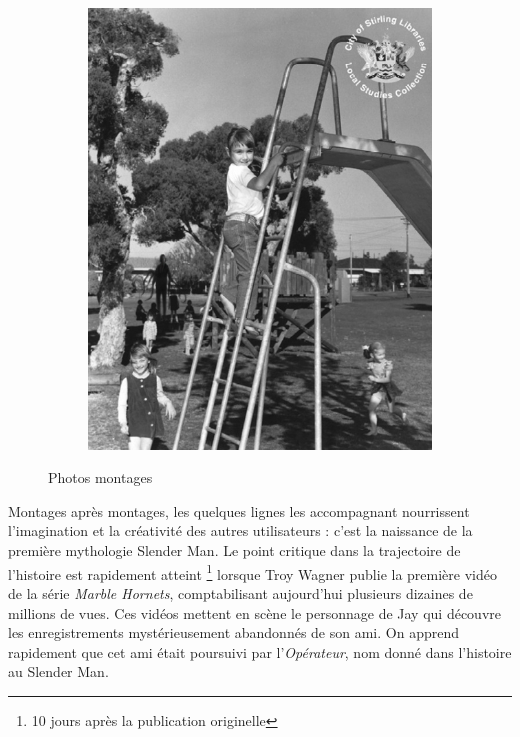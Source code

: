 \documentclass[12pt,a4paper,oneside,titlepage]{book} %
\begin{document}
\begin{figure}[htbp]
\begin{subfigure}[b]{0.45\textwidth}
        \label{fig:slender1}
    \end{subfigure}
    \hfill
    \begin{subfigure}[b]{0.45\textwidth}
        \centering
        \includegraphics[width=\textwidth]{illustration/slender2.jpg}
        \label{fig:slender2}
    \end{subfigure}
    \caption{Photos montages}
    \label{fig:slender_composite}
\end{figure}

Montages après montages, les quelques lignes les accompagnant nourrissent l'imagination et la créativité des autres utilisateurs : c'est la naissance de la première mythologie Slender Man. 
Le point critique dans la trajectoire de l'histoire est rapidement atteint \footnote{10 jours après la publication originelle} lorsque Troy Wagner publie la première vidéo de la série \textit{Marble Hornets}, comptabilisant aujourd'hui plusieurs dizaines de millions de vues. Ces vidéos mettent en scène le personnage de Jay qui découvre les enregistrements mystérieusement abandonnés de son ami. On apprend rapidement que cet ami était poursuivi par l'\textit{Opérateur}, nom donné dans l'histoire au Slender Man. 
\end{document}
